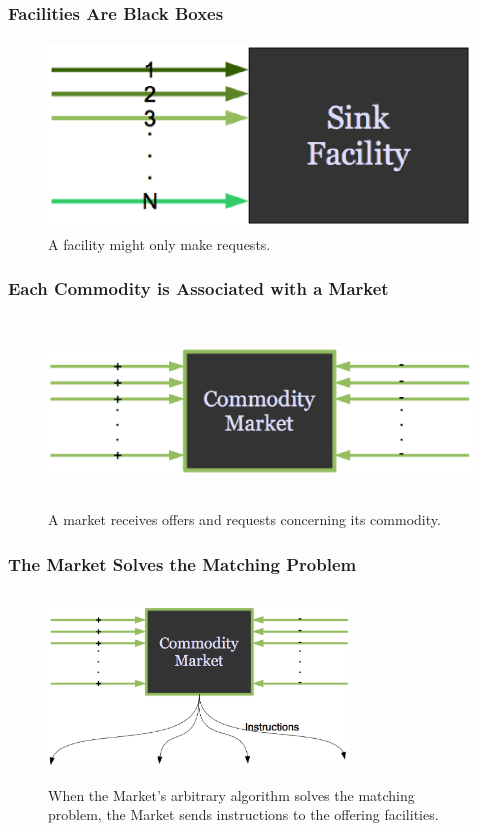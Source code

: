 \begin{frame}[ctb!]
  \frametitle{Facilities Are Black Boxes}
  \begin{figure}[htbp!]
    \begin{center}
      \includegraphics[height=5cm]{sinkfacility.eps}
    \end{center}
    \caption{ A facility might only make requests.} 
    \label{fig:sinkfacility}
  \end{figure}
\end{frame}
\begin{frame}[ctb!]
  \frametitle{Each Commodity is Associated with a Market}
  \begin{figure}[htbp!]
    \begin{center}
      \includegraphics[height=5cm]{market.eps}
    \end{center}
    \caption{ A market receives offers and requests concerning its 
    commodity. } 
    \label{fig:market}
  \end{figure}
\end{frame}
\begin{frame}[ctb!]
  \frametitle{The Market Solves the Matching Problem}
  \begin{figure}[htbp!]
    \begin{center}
      \includegraphics[height=5cm,width=8cm]{instructions.eps}
    \end{center}
    \caption{ When the Market's arbitrary algorithm solves the 
    matching problem, the Market sends instructions to the offering 
    facilities.} 
    \label{fig:instructions}
  \end{figure}
\end{frame}
